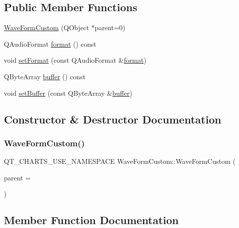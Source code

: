\subsection*{Public Member Functions}
\begin{DoxyCompactItemize}
\item 
\hyperlink{class_wave_form_custom_af4c78a9a88ccb502909249d5069bb238}{Wave\+Form\+Custom} (Q\+Object $\ast$parent=0)
\item 
Q\+Audio\+Format \hyperlink{class_wave_form_custom_a4fc6efc93c4e13d29fb5cbabb8354cfb}{format} () const
\item 
void \hyperlink{class_wave_form_custom_a4280e281f1b4e91710c791751b4c956d}{set\+Format} (const Q\+Audio\+Format \&\hyperlink{class_wave_form_custom_a4fc6efc93c4e13d29fb5cbabb8354cfb}{format})
\item 
Q\+Byte\+Array \hyperlink{class_wave_form_custom_a90fb1825e9929177cf5e034a464e4e24}{buffer} () const
\item 
void \hyperlink{class_wave_form_custom_aa30d2651a92723178f74d0d14fa13809}{set\+Buffer} (const Q\+Byte\+Array \&\hyperlink{class_wave_form_custom_a90fb1825e9929177cf5e034a464e4e24}{buffer})
\end{DoxyCompactItemize}


\subsection{Constructor \& Destructor Documentation}
\hypertarget{class_wave_form_custom_af4c78a9a88ccb502909249d5069bb238}{}\label{class_wave_form_custom_af4c78a9a88ccb502909249d5069bb238} 
\subsubsection{\texorpdfstring{Wave\+Form\+Custom()}{WaveFormCustom()}}
{\footnotesize\ttfamily Q\+T\+\_\+\+C\+H\+A\+R\+T\+S\+\_\+\+U\+S\+E\+\_\+\+N\+A\+M\+E\+S\+P\+A\+CE Wave\+Form\+Custom\+::\+Wave\+Form\+Custom (\begin{DoxyParamCaption}\item[{Q\+Object $\ast$}]{parent = {} }\end{DoxyParamCaption})\hspace{0.3cm}{\ttfamily [explicit]}}



\subsection{Member Function Documentation}
\hypertarget{class_wave_form_custom_a90fb1825e9929177cf5e034a464e4e24}{}\label{class_wave_form_custom_a90fb1825e9929177cf5e034a464e4e24} 
